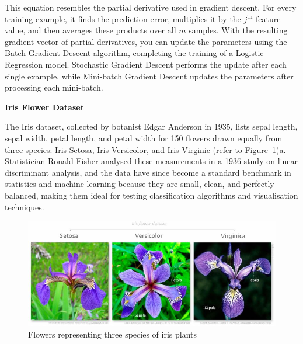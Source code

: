 \documentclass[12pt,letter]{article}
\begin{document}
This equation resembles the partial derivative used in gradient descent. For every training example, it finds the prediction error, multiplies it by the $j^\text{th}$ feature value, and then averages these products over all $m$ samples. With the resulting gradient vector of partial derivatives, you can update the parameters using the Batch Gradient Descent algorithm, completing the training of a Logistic Regression model. Stochastic Gradient Descent performs the update after each single example, while Mini-batch Gradient Descent updates the parameters after processing each mini-batch.



\begin{data}
\textbf{Iris Flower Dataset}

\noindent The Iris dataset, collected by botanist Edgar Anderson in 1935, lists sepal length, sepal width, petal length, and petal width for 150 flowers drawn equally from three species: Iris-Setosa, Iris-Versicolor, and Iris-Virginic  (refer to Figure~\ref{fig:iris_species})a. Statistician Ronald Fisher analysed these measurements in a 1936 study on linear discriminant analysis, and the data have since become a standard benchmark in statistics and machine learning because they are small, clean, and perfectly balanced, making them ideal for testing classification algorithms and visualisation techniques.




\begin{figure}[H]
    \centering
    \includegraphics[width=5.5in]{../figures/iris_species.jpg}
    \caption{Flowers representing three species of iris plants \protect\footnotemark[1]}
    \label{fig:iris_species}
\end{figure}


\end{data}
\end{document}
